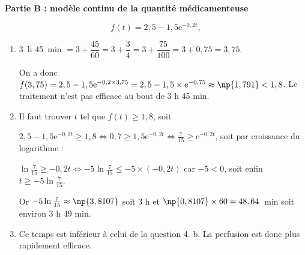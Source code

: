 \bigskip

\textbf{Partie B : modèle continu de la quantité médicamenteuse}

\medskip








\[f(t) = 2,5 - 1,5\text{e}^{-0,2t},\]







\begin{enumerate}
\item 
 3~h 45~min $= 3 + \dfrac{45}{60} = 3 + \dfrac{3}{4} = 3 + \dfrac{75}{100} = 3 + 0,75 = 3,75$.
 
 On a donc $f(3,75) = 2,5 - 1,5\text{e}^{-0,2 \times 3,75} = 2,5 - 1,5 \times \text{e}^{-0,75} \approx \np{1,791} <  1,8$. Le traitement n'est pas efficace au bout de 3 h 45 min.
\item 
Il faut trouver $t$ tel que $f(t) \geqslant 1,8$, soit

$2,5 - 1,5\text{e}^{-0,2t} \geqslant 1,8 \iff 0,7 \geqslant 1,5\text{e}^{-0,2t} \iff \frac{7}{15} \geqslant \text{e}^{-0,2t}$, soit par croissance du logarithme :

$\ln \frac{7}{15} \geqslant - 0,2t \iff -5\ln \frac{7}{15} \leqslant -5 \times (- 0,2t)$ car $- 5 < 0$, soit enfin $t \geqslant  -5\ln \frac{7}{15}$.

Or $ -5\ln \frac{7}{15} \approx \np{3,8107}$ soit 3 h et $\np{0,8107} \times 60 = 48,64$~min soit environ 3 h 49 min.
\item 
Ce temps est inférieur à celui de la question 4. b. La perfusion est donc plus rapidement efficace.
\end{enumerate}

\bigskip
